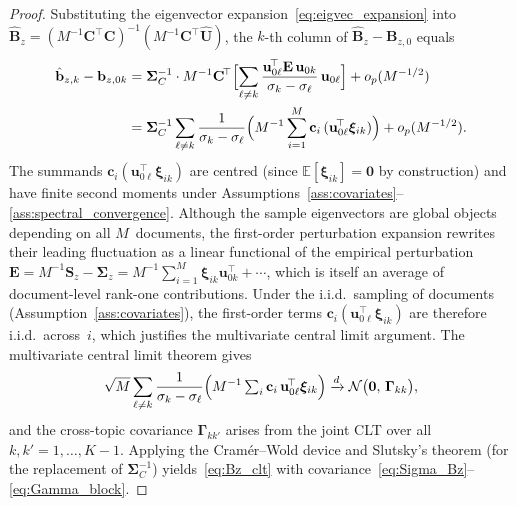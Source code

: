 \documentclass{article}
\begin{document}
\begin{proof}
Substituting the eigenvector
expansion~\eqref{eq:eigvec_expansion} into
$\hat{\mathbf{B}}_z = (M^{-1}\mathbf{C}^{\!\top}\mathbf{C})^{-1}
(M^{-1}\mathbf{C}^{\!\top}\hat{\mathbf{U}})$, the $k$-th column of
$\hat{\mathbf{B}}_z - \mathbf{B}_{z,0}$ equals
\begin{align}
  \hat{\mathbf{b}}_{z,k} - \mathbf{b}_{z,0k}
  &= \boldsymbol{\Sigma}_C^{-1}
     \cdot M^{-1}\mathbf{C}^{\!\top}
     \Bigl[
       \sum_{\ell\neq k}
       \frac{\mathbf{u}_{0\ell}^{\!\top}\mathbf{E}\,\mathbf{u}_{0k}}
            {\sigma_k - \sigma_\ell}\,\mathbf{u}_{0\ell}
     \Bigr]
     + o_p(M^{-1/2}) \notag\\
  &= \boldsymbol{\Sigma}_C^{-1}
     \sum_{\ell\neq k}
     \frac{1}{\sigma_k - \sigma_\ell}
     \Bigl(
       M^{-1}\sum_{i=1}^M
       \mathbf{c}_i\,
       (\mathbf{u}_{0\ell}^{\!\top}\boldsymbol{\xi}_{ik})
     \Bigr)
     + o_p(M^{-1/2}).
  \label{eq:Bz_expansion}
\end{align}
The summands
$\mathbf{c}_i(\mathbf{u}_{0\ell}^{\!\top}\boldsymbol{\xi}_{ik})$
are centred (since $\mathbb{E}[\boldsymbol{\xi}_{ik}]=\mathbf{0}$
by construction) and have finite
second moments under
Assumptions~\ref{ass:covariates}--\ref{ass:spectral_convergence}.
Although the sample eigenvectors are global objects depending on all
$M$~documents, the first-order perturbation expansion rewrites their
leading fluctuation as a linear functional of the empirical perturbation
$\mathbf{E} = M^{-1}\mathbf{S}_z - \boldsymbol{\Sigma}_z
 = M^{-1}\sum_{i=1}^M \boldsymbol{\xi}_{ik}\mathbf{u}_{0k}^{\!\top}
   + \cdots$,
which is itself an average of document-level rank-one contributions.
Under the i.i.d.\ sampling of documents
(Assumption~\ref{ass:covariates}), the first-order terms
$\mathbf{c}_i(\mathbf{u}_{0\ell}^{\!\top}\boldsymbol{\xi}_{ik})$ are
therefore i.i.d.\ across~$i$, which justifies the multivariate central
limit argument.
The multivariate central limit theorem gives
\[
  \sqrt{M}\sum_{\ell\neq k}
  \frac{1}{\sigma_k-\sigma_\ell}
  \Bigl(
    M^{-1}\textstyle\sum_i
    \mathbf{c}_i\,\mathbf{u}_{0\ell}^{\!\top}\boldsymbol{\xi}_{ik}
  \Bigr)
  \xrightarrow{d}
  \mathcal{N}\bigl(\mathbf{0},\,
    \boldsymbol{\Gamma}_{kk}\bigr),
\]
and the cross-topic covariance $\boldsymbol{\Gamma}_{kk'}$ arises from
the joint CLT over all $k,k'=1,\dots,K{-}1$.
Applying the Cram\'er--Wold device and Slutsky's theorem (for the
replacement of $\boldsymbol{\Sigma}_C^{-1}$) yields~\eqref{eq:Bz_clt}
with covariance~\eqref{eq:Sigma_Bz}--\eqref{eq:Gamma_block}.
\end{proof}
\end{document}
